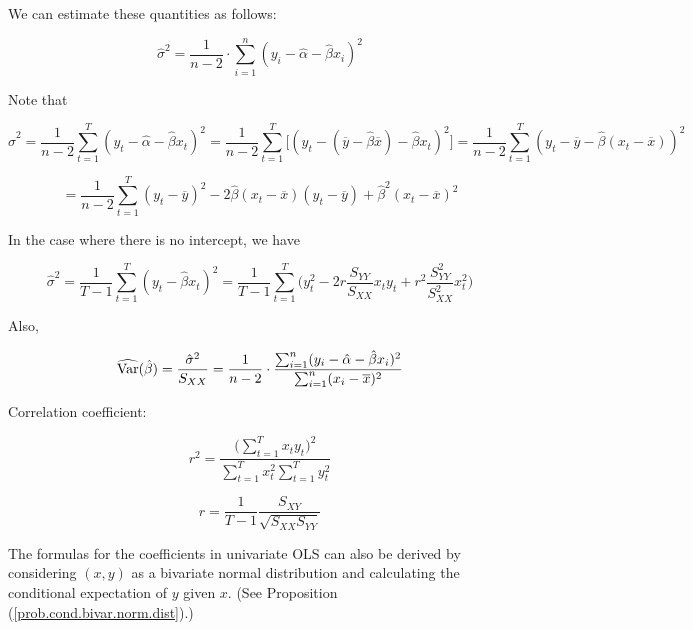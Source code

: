We can estimate these quantities as follows:

\[
\hat{\sigma}^2 = \frac{1}{n - 2} \cdot \sum_{i=1}^n(y_i - \hat{\alpha} - \hat{\beta} x_i)^2
\]

Note that

\[
\hat{\sigma}^2 =  \frac{1}{n - 2}\sum_{t=1}^T(y_t - \hat{\alpha} - \hat{\beta} x_t)^2 =  \frac{1}{n - 2}\sum_{t=1}^T \big[ (y_t - (\overline{y} - \hat{\beta} \overline{x}) - \hat{\beta} x_t)^2 \big] = \frac{1}{n - 2} \sum_{t=1}^T(y_t - \overline{y} - \hat{\beta}( x_t - \overline{x}))^2 
\]

\[
=\frac{1}{n - 2} \sum_{t=1}^T(y_t - \overline{y})^2 - 2\hat{\beta}( x_t - \overline{x})(y_t - \overline{y})+ \hat{\beta}^2( x_t - \overline{x})^2
\]

In the case where there is no intercept, we have

\[
\hat{\sigma}^2 =  \frac{1}{T - 1}\sum_{t=1}^T(y_t  - \hat{\beta} x_t)^2 = \frac{1}{T - 1} \sum_{t=1}^T \bigg(y_t^2 - 2r \frac{S_{YY}}{S_{XX}}x_ty_t + r^2 \frac{S_{YY}^2}{S_{XX}^2} x_t^2 \bigg)
\]

Also,

\[
\widehat{\Var}(\hat{\beta}) = \frac{\hat{\sigma}^2}{S_{XX}} = \frac{1}{n - 2} \cdot \frac{ \sum_{i=1}^n(y_i - \hat{\alpha} - \hat{\beta} x_i)^2 }{\sum_{i=1}^n (x_i - \overline{x})^2 }
\]

Correlation coefficient:

\[
r^2 =  \frac{\big(\sum_{t=1}^T x_t y_t \big)^2}{\sum_{t=1}^T x_t^2 \sum_{t=1}^T y_t^2 }
\]

\[
r = \frac{1}{T-1} \frac{S_{XY}}{\sqrt{S_{XX}S_{YY}}}
\]

\begin{remark}The formulas for the coefficients in univariate OLS can also be derived by considering \((x, y)\) as a bivariate normal distribution and calculating the conditional expectation of \(y\) given \(x\). (See Proposition (\ref{prob.cond.bivar.norm.dist}).)\end{remark}

